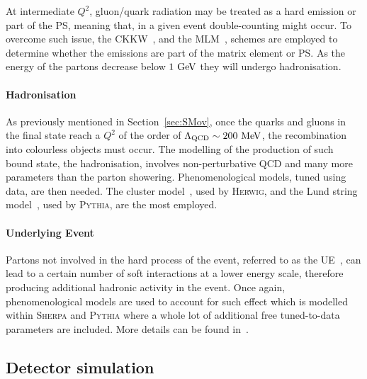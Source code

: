 				At intermediate $Q^2$, gluon/quark radiation may be treated as a hard emission or part of the \ac{PS}, meaning that, in a given event double-counting might occur. To overcome such issue, the \ac{CKKW}~\cite{QCD2001}, and the \ac{MLM}~\cite{ME2001}, schemes are employed to determine whether the emissions are part of the matrix element or \ac{PS}. As the energy of the partons decrease below $1 \GeV$ they will undergo hadronisation.

			\paragraph*{Hadronisation}

				As previously mentioned in Section~\ref{sec:SMov}, once the quarks and gluons in the final state reach a $Q^2$ of the order of $\Lambda_{\mathrm{QCD}} \sim 200 \MeV$, the recombination into colourless objects must occur. The modelling of the production of such bound state, the hadronisation, involves non-perturbative \ac{QCD} and many more parameters than the parton showering. Phenomenological models, tuned using data, are then needed. The cluster model~\cite{ClusterHerwig1999}, used by \textsc{Herwig}, and the Lund string model~\cite{LundModel2002}, used by \textsc{Pythia}, are the most employed. 

			\paragraph*{Underlying Event}

				Partons not involved in the hard process of the event, referred to as the \ac{UE}~\cite{Field2008}, can lead to a certain number of soft interactions at a lower energy scale, therefore producing additional hadronic activity in the event. Once again, phenomenological models are used to account for such effect which is modelled within \textsc{Sherpa} and \textsc{Pythia} where a whole lot of additional free tuned-to-data parameters are included. More details can be found in~\cite{Field2008}.



		\subsection{Detector simulation}
		\label{subsec:detSim}

